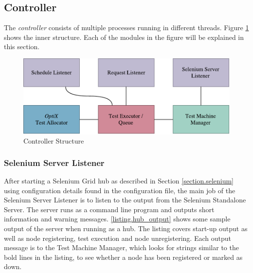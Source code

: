 




\subsection{Controller}

The \emph{controller} consists of multiple processes running in different threads. Figure \ref{fig.controller_structure} shows the inner structure. Each of the modules in the figure will be explained in this section.

\begin{figure}[h]
    \centering
    \includegraphics[width=\textwidth]{figures/controller4.pdf}
    \caption{Controller Structure}
    \label{fig.controller_structure}
\end{figure}

\subsubsection{Selenium Server Listener}
After starting a Selenium Grid hub as described in Section \ref{section.selenium} using configuration details found in the configuration file, the main job of the Selenium Server Listener is to listen to the output from the Selenium Standalone Server. The server runs as a command line program and outputs short information and warning messages. \lstlistingname \space \ref{listing.hub_output} shows some sample output of the server when running as a hub. The listing covers start-up output as well as node registering, test execution and node unregistering. Each output message is to the Test Machine Manager, which looks for strings similar to the bold lines in the listing, to see whether a node has been registered or marked as down.


